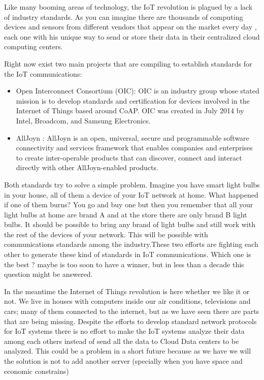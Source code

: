 Like many booming areas of technology, the IoT revolution is plagued by a lack
of industry standards. As you can imagine there are thousands of computing
devices and sensors from different vendors that appear on the market  every day
, each one with his unique way to send  or store their data in their
centralized cloud computing centers.

Right now exist two main projects that are compiling to establish standards for
the IoT communications: 

\begin{itemize}
\item Open Interconnect Consortium (OIC): OIC is an industry group whose stated 
mission is to develop standards and certification for devices involved in the 
Internet of Things based around CoAP. OIC was created in July 2014 by Intel, 
Broadcom, and Samsung Electronics.\cite{OIC}

\item AllJoyn : AllJoyn is an open, universal, secure and programmable software 
connectivity and services framework that enables companies and enterprises to 
create inter-operable products that can discover, connect and interact directly 
with other AllJoyn-enabled products. \cite{AllJoyn}
\end{itemize}


Both standards try to solve a simple problem. Imagine you have smart light bulbs
in your house, all of them a device of your IoT network at home. What happened
if one of them burns? You go and buy one but then you remember that all your
light bulbs at home are brand A and at the store there are only brand B
light bulbs. It should be possible to bring any brand of light bulbs and
still work with the rest of the devices of your network. This will be possible
with communications standards among the industry.These two efforts are fighting
each other to generate these kind of standards in IoT communications. Which one
is the best ? maybe is too soon to have a winner, but in less than a decade
this question might be answered. 

In the meantime the Internet of Things revolution is here whether we like it or
not. We live in houses with computers inside our air conditions, televisions
and cars; many of them connected to the internet, but as we have seen there are
parts that are being missing. Despite the efforts to develop standard network
protocols for IoT systems there is no effort to make the IoT systems analyze
their data among each others instead of send  all the data to Cloud Data
centers to be analyzed. This could be a problem in a short future because as we
have we will the solution is not to add another server (specially when you have
space and economic constrains)



